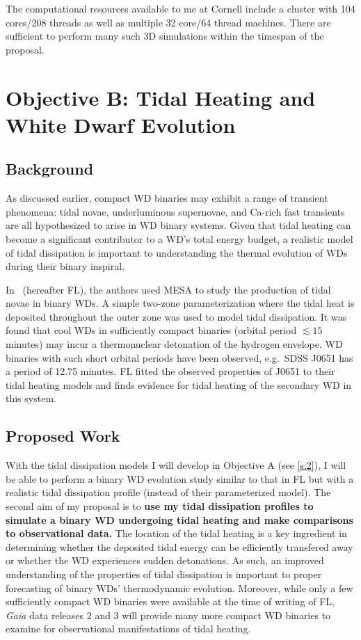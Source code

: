 \documentclass[12pt,
        usenames, %
        dvipsnames %
    ]{article}
\begin{document}
The computational resources available to me at Cornell include a cluster with
104 cores/208 threads as well as multiple 32 core/64 thread machines. There are
sufficient to perform many such 3D simulations within the timespan of the
proposal.

\section{Objective B\@: Tidal Heating and White Dwarf Evolution}\label{s:3}

\subsection{Background}

As discussed earlier, compact WD binaries may exhibit a range of transient
phenomena: tidal novae\cite{tidal_novae}, underluminous
supernovae\cite{underlum}, and Ca-rich fast transients\cite{carich} are all
hypothesized to arise in WD binary systems. Given that tidal heating can become
a significant contributor to a WD's total energy budget, a realistic model of
tidal dissipation is important to understanding the thermal evolution of WDs
during their binary inspiral.

In~\cite{tidal_novae} (hereafter FL), the authors used MESA\cite{MESA} to study
the production of tidal novae in binary WDs. A simple two-zone parameterization
where the tidal heat is deposited throughout the outer zone was used to model
tidal dissipation. It was found that cool WDs in sufficiently compact binaries
(orbital period $\lesssim 15$ minutes) may incur a thermonuclear detonation of
the hydrogen envelope. WD binaries with such short orbital periods have been
observed, e.g.\ SDSS J0651 has a period of 12.75 minutes\cite{12min}. FL fitted
the observed properties of J0651 to their tidal heating models and finds
evidence for tidal heating of the secondary WD in this system.

\subsection{Proposed Work}

With the tidal dissipation models I will develop in Objective A (see
\autoref{s:2}), I will be able to perform a binary WD evolution study similar to
that in FL but with a realistic tidal dissipation profile (instead of their
parameterized model). The second aim of my proposal is to \textbf{use my tidal
dissipation profiles to simulate a binary WD undergoing tidal heating and make
comparisons to observational data.} The location of the tidal heating is a key
ingredient in determining whether the deposited tidal energy can be efficiently
transfered away or whether the WD experiences sudden detonations. As such, an
improved understanding of the properties of tidal dissipation is important to
proper forecasting of binary WDs' thermodynamic evolution. Moreover, while only
a few sufficiently compact WD binaries were available at the time of writing of
FL, \emph{Gaia} data releases 2 and 3 will provide many more compact WD binaries
to examine for observational manifestations of tidal heating.
\end{document}
